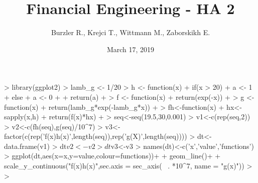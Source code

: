 \documentclass{article}
\title{Financial Engineering - HA 2}
\author{Burzler R., Krejci T., Wittmann M., Zaborskikh E.}
\date{March 17, 2019}
\begin{document}


\maketitle


\begin{Schunk}
\begin{Sinput}
> library(ggplot2)
> lamb_g <- 1/20
> h <- function(x) { 
+   if(x > 20) {
+     a <- 1
+   } else {
+       a <- 0
+       }
+   return(a)
+ }
> f <- function(x) {
+   return(exp(-x)) 
+ }
> g <- function(x) {
+   return(lamb_g*exp(-lamb_g*x)) 
+ }
> fh<-function(x){
+   hx<-sapply(x,h)
+   return(f(x)*hx)
+ }
> seq<-seq(19.5,30,0.001)
> v1<-c(rep(seq,2))
> v2<-c(fh(seq),g(seq)/10^7)
> v3<-factor(c(rep('f(x)h(x)',length(seq)),rep('g(X)',length(seq))))
> dt<-data.frame(v1)
> dt$v2<-v2
> dt$v3<-v3
> names(dt)<-c('x','value','functions')
> ggplot(dt,aes(x=x,y=value,colour=functions))+
+   geom_line()+
+   scale_y_continuous("f(x)h(x)",sec.axis = sec_axis(~ . *10^7, name = "g(x)"))
>           
> 
\end{Sinput}
\end{Schunk}
\end{document}
